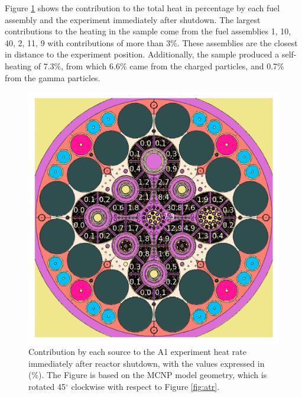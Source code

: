 Figure \ref{fig:atr-contrib} shows the contribution to the total heat in percentage by each fuel assembly and the experiment immediately after shutdown.
The largest contributions to the heating in the sample come from the fuel assemblies 1, 10, 40, 2, 11, 9 with contributions of more than 3\%.
These assemblies are the closest in distance to the experiment position.
Additionally, the sample produced a self-heating of 7.3\%, from which 6.6\% came from the charged particles, and 0.7\% from the gamma particles.


\begin{figure}[htbp!] %
    \centering
    \includegraphics[width=0.90\linewidth]{figures/atr-contributions}
    \hfill
    \caption{Contribution by each source to the A1 experiment heat rate immediately after reactor shutdown, with the values expressed in (\%). The Figure is based on the MCNP model geometry, which is rotated 45$^{\circ}$ clockwise with respect to Figure \ref{fig:atr}.}
    \label{fig:atr-contrib}
\end{figure}


